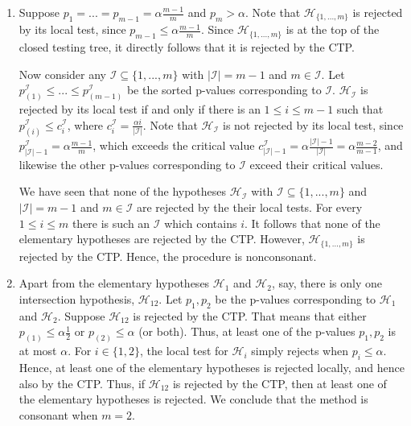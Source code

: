 \documentclass[11pt]{article}
\theoremstyle{plain}
\theoremstyle{definition}
\newcommand{\I}{\mathcal{I}}
\newcommand{\Hy}{\mathcal{H}}
\begin{document}
\begin{sols}
\begin{enumerate}
(b) Consider $1\leq j \leq k$ and suppose $\Hy_j$ is rejected by the original procedure. We will show that it is rejected by the defined closed testing procedure. Note that the local test rejects $\Hy_j$. Moreover, by coherence, all hypotheses among $\Hy_1,...,\Hy_k$ that imply $\Hy_j$, are rejected by the original procedure. Consider an intersection hypothesis $\Hy_{\I}$ with $j\in \I$.  $\Hy_j$ is rejected locally and is implied by $\Hy_{\I}$, so by definition of the local tests, $\Hy_{\I}$ is rejected locally. Thus, all $\Hy_{\I}$ with $j\in \I$ are rejected locally, so $\Hy_j$ is rejected by the defined CTP.

Conversely, suppose $\Hy_j$ is rejected by the defined closed testing procedure. Then $\Hy_j$ is rejected locally, and by construction this means the original procedure rejects it. This finishes the proof.


\item Suppose  $p_1=...=p_{m-1}=\alpha\frac{m-1}{m}$ and $p_m>\alpha$. 
Note that $\Hy_{\{1,...,m\}}$ is rejected by its local test, since $p_{m-1}\leq\alpha\frac{m-1}{m}$.
Since $\Hy_{\{1,...,m\}}$ is at the top of the closed testing tree, it directly follows that it is rejected by the CTP.

Now consider any $\I\subseteq \{1,...,m\}$ with $|\I|=m-1$ and $m\in \I$. Let $p_{(1)}^{\I}\leq...\leq p_{(m-1)}^{\I} $ be the sorted p-values corresponding to $\I$.
$\Hy_{\I}$ is rejected by its local test if and only if there is an $1\leq i \leq m-1$ such that $p_{(i)}^{\I}\leq c^\I_i$, where $c^\I_i =\frac{\alpha i}{|\I|}$.
Note that $\Hy_{\I}$ is not rejected by its local test, since $p^{\I}_{|\I|-1}= \alpha\frac{ m-1}{m}$, which exceeds the critical value $c^{\I}_{|\I|-1}=\alpha\frac{ |\I|-1}{|\I|}=\alpha\frac{ m-2}{m-1}$, and likewise the other p-values corresponding to $\I$ exceed their critical values.

We have seen that none of the hypotheses $\Hy_{\I}$ with $\I\subseteq \{1,...,m\}$ and $|\I|=m-1$ and $m\in \I$ are  rejected by the their local tests. For every $1\leq i \leq m$ there is such an $\I$ which contains $i$. It follows that none of the elementary hypotheses are rejected by the CTP. However, $\Hy_{\{1,...,m\}}$ is rejected by the CTP. Hence, the procedure is nonconsonant.



\item
Apart from the elementary hypotheses $\Hy_1$ and $\Hy_2$, say, there is only one intersection hypothesis, $\Hy_{12}$. Let $p_1, p_2$ be the p-values corresponding to $\Hy_1$ and $\Hy_2$.
Suppose $\Hy_{12}$ is rejected by the CTP. 
That means that either $p_{(1)}\leq \alpha\frac{1}{2}$ or $p_{(2)}\leq \alpha$ (or both). Thus, at least one of the p-values $p_1, p_2$ is at most $\alpha$. 
For $i\in\{1,2\}$, the local test for $\Hy_i$ simply rejects when $p_i\leq \alpha$. Hence, at least one of the elementary hypotheses is rejected locally, and hence also by the CTP.
Thus, if $\Hy_{12}$ is rejected by the CTP, then at least one of the elementary hypotheses is rejected. We conclude that the method is consonant when $m=2$.


\end{enumerate}
\end{sols}
\end{document}

